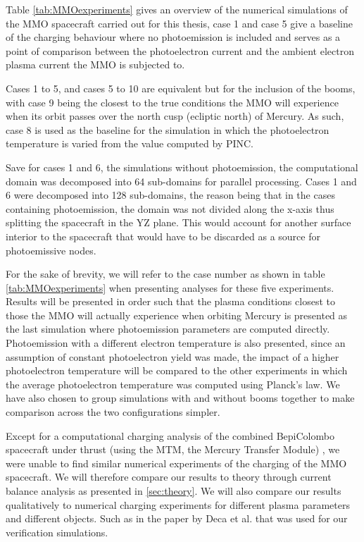 Table \ref{tab:MMOexperiments} gives an overview of the numerical simulations of the MMO spacecraft carried out for this thesis, case 1 and case 5 give a baseline of the charging behaviour where no photoemission is included and serves as a point of comparison between the photoelectron current and the ambient electron plasma current the MMO is subjected to. 

Cases 1 to 5, and cases 5 to 10 are equivalent but for the inclusion of the booms, with case 9 being the closest to the true conditions the MMO will experience when its orbit passes over the north cusp (ecliptic north) of Mercury. As such, case 8 is used as the baseline for the simulation in which the photoelectron temperature is varied from the value computed by PINC.

Save for cases 1 and 6, the simulations without photoemission, the computational domain was decomposed into 64 sub-domains for parallel processing. Cases 1 and 6 were decomposed into 128 sub-domains, the reason being that in the cases containing photoemission, the domain was not divided along the x-axis thus splitting the spacecraft in the YZ plane. This would account for another surface interior to the spacecraft that would have to be discarded as a source for photoemissive nodes.

For the sake of brevity, we will refer to the case number as shown in table \ref{tab:MMOexperiments} when presenting analyses for these five experiments. Results will be presented in order such that the plasma conditions closest to those the MMO will actually experience when orbiting Mercury is presented as the last simulation where photoemission parameters are computed directly. Photoemission with a different electron temperature is also presented, since an assumption of constant photoelectron yield was made, the impact of a higher photoelectron temperature will be compared to the other experiments in which the average photoelectron temperature was computed using Planck's law. We have also chosen to group simulations with and without booms together to make comparison across the two configurations simpler.

Except for a computational charging analysis of the combined BepiColombo spacecraft under thrust (using the MTM, the Mercury Transfer Module) \parencite{ESA}, we were unable to find similar numerical experiments of the charging of the MMO spacecraft. We will therefore compare our results to theory through current balance analysis as presented in \ref{sec:theory}. We will also compare our results qualitatively to numerical charging experiments for different plasma parameters and different objects. Such as in the paper by Deca et al. \parencite{Deca2013} that was used for our verification simulations.

